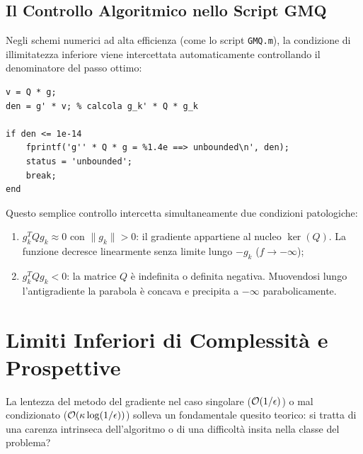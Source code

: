 \subsection{Il Controllo Algoritmico nello Script GMQ}
Negli schemi numerici ad alta efficienza (come lo script \texttt{GMQ.m}), la condizione di illimitatezza inferiore viene intercettata automaticamente controllando il denominatore del passo ottimo:
\begin{lstlisting}[style=code,caption={Verifica numerica di illimitatezza nello script GMQ.}]
v = Q * g;
den = g' * v; % calcola g_k' * Q * g_k

if den <= 1e-14
    fprintf('g'' * Q * g = %1.4e ==> unbounded\n', den);
    status = 'unbounded';
    break;
end
\end{lstlisting}
Questo semplice controllo intercetta simultaneamente due condizioni patologiche:
\begin{enumerate}
    \item $g_k^T Q g_k \approx 0$ con $\|g_k\| > 0$: il gradiente appartiene al nucleo $\ker(Q)$. La funzione decresce linearmente senza limite lungo $-g_k$ ($f \to -\infty$);
    \item $g_k^T Q g_k < 0$: la matrice $Q$ \`e indefinita o definita negativa. Muovendosi lungo l'antigradiente la parabola \`e concava e precipita a $-\infty$ parabolicamente.
\end{enumerate}

\FloatBarrier
\section{Limiti Inferiori di Complessit\`a e Prospettive}
\label{sec:limiti-inferiori-complessita}

La lentezza del metodo del gradiente nel caso singolare ($\mathcal{O}\!\left(1/\epsilon\right)$) o mal condizionato ($\mathcal{O}\!\left(\kappa \log(1/\epsilon)\right)$) solleva un fondamentale quesito teorico: si tratta di una carenza intrinseca dell'algoritmo o di una difficolt\`a insita nella classe del problema?

